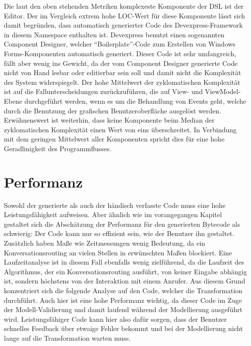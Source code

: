 \newline
Die laut den oben stehenden Metriken komplexeste Komponente der DSL ist der Editor. Der im Vergleich extrem hohe LOC-Wert für diese Komponente lässt sich damit begründen, dass automatisch generierter Code des Devexpress-Framework in diesem Namespace enthalten ist. Devexpress benutzt einen sogenannten Component Designer, welcher ``Boilerplate''-Code zum Erstellen von Windows Forms-Komponenten automatisch generiert. Dieser Code ist sehr umfangreich, fällt aber wenig ins Gewicht, da der vom Component Designer generierte Code nicht von Hand lesbar oder editierbar sein soll und damit nicht die Komplexität des System widerspiegelt. Der hohe Mittelwert der zyklomatischen Komplexität ist auf die Fallunterscheidungen zurückzuführen, die auf View- und ViewModel-Ebene durchgeführt werden, wenn es um die Behandlung von Events geht, welche durch die Benutzung der grafischen Benutzeroberfläche ausgelöst werden.
\newline
Erwähnenswert ist weiterhin, dass keine Komponente beim Median der zyklomatischen Komplexität einen Wert von eins überschreitet. In Verbindung mit dem geringen Mittelwert aller Komponenten spricht dies für eine hohe Geradlinigkeit des Programmflusses. 

\section{Performanz}
Sowohl der generierte als auch der händisch verfasste Code muss eine hohe Leistungsfähigkeit aufweisen. Aber ähnlich wie im vorangegangen Kapitel gestaltet sich die Abschätzung der Performanz für den generierten Bytecode als schwierig: Der Code kann nur so effizient sein, wie der Benutzer ihn gestaltet. Zusätzlich haben Maße wie Zeitmessungen wenig Bedeutung, da ein Konversationsrouting an vielen Stellen in erwünschten Maßen blockiert. Eine Laufzeitanalyse ist in diesem Fall ebenfalls wenig zielführend, da die Laufzeit des Algorithmus, der ein Konversationsrouting ausführt, von keiner Eingabe abhängig ist, sondern höchstens von der Interaktion mit einem Anrufer.
\newline
Aus diesem Grund konzentriert sich die folgende Analyse auf den Code, welcher die Transformation durchführt. Auch hier ist eine hohe Performanz wichtig, da dieser Code im Zuge der Modell-Validierung und damit laufend während der Modellierung ausgeführt wird. Leistungsfähiger Code kann hier also dafür sorgen, dass der Benutzer schnelles Feedback über etwaige Fehler bekommt und bei der Modellierung nicht lange auf die Transformation warten muss.

